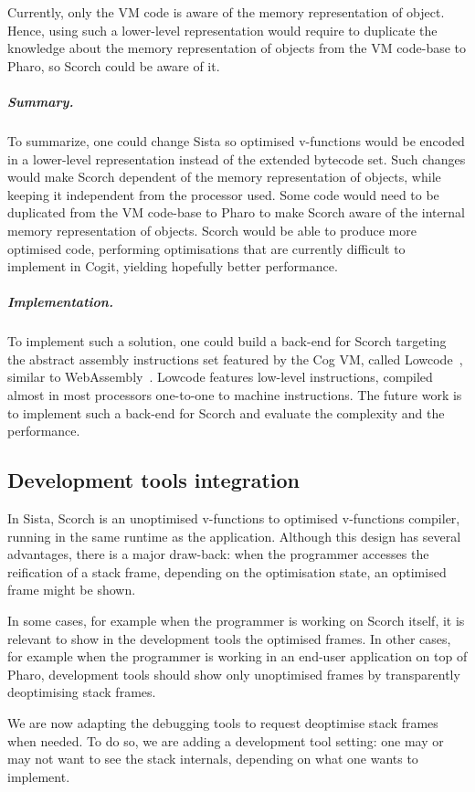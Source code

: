 \documentclass[a4paper,12pt,twoside]{../includes/ThesisStyle}
\begin{document}
Currently, only the VM code is aware of the memory representation of object. Hence, using such a lower-level representation would require to duplicate the knowledge about the memory representation of objects from the VM code-base to Pharo, so Scorch could be aware of it. 

\subparagraph{Summary.}To summarize, one could change Sista so optimised v-functions would be encoded in a lower-level representation instead of the extended bytecode set. Such changes would make Scorch dependent of the memory representation of objects, while keeping it independent from the processor used. Some code would need to be duplicated from the VM code-base to Pharo to make Scorch aware of the internal memory representation of objects. Scorch would be able to produce more optimised code, performing optimisations that are currently difficult to implement in Cogit, yielding hopefully better performance.

\subparagraph{Implementation.}To implement such a solution, one could build a back-end for Scorch targeting the abstract assembly instructions set featured by the Cog VM, called Lowcode~\cite{Salg16a}, similar to WebAssembly~\cite{WebAssembly}. Lowcode features low-level instructions, compiled almost in most processors one-to-one to machine instructions. The future work is to implement such a back-end for Scorch and evaluate the complexity and the performance.

\subsection{Development tools integration}
\label{ss:FWIDE}

In Sista, Scorch is an unoptimised v-functions to optimised v-functions compiler, running in the same runtime as the application. Although this design has several advantages, there is a major draw-back: when the programmer accesses the reification of a stack frame, depending on the optimisation state, an optimised frame might be shown. 

In some cases, for example when the programmer is working on Scorch itself, it is relevant to show in the development tools the optimised frames. In other cases, for example when the programmer is working in an end-user application on top of Pharo, development tools should show only unoptimised frames by transparently deoptimising stack frames.

We are now adapting the debugging tools to request deoptimise stack frames when needed. To do so, we are adding a development tool setting: one may or may not want to see the stack internals, depending on what one wants to implement.
\end{document}
